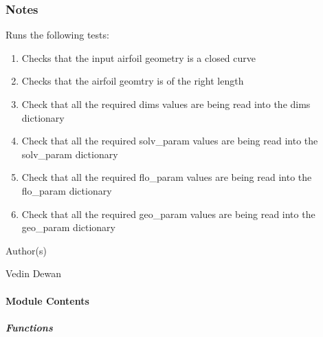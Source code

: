 \documentclass[letterpaper,10pt,english]{sphinxmanual}
\begin{document}
\subsubsection*{Notes}

\sphinxAtStartPar
Runs the following tests:
\begin{enumerate}
%
\item {} 
\sphinxAtStartPar
Checks that the input airfoil geometry is a closed curve

\item {} 
\sphinxAtStartPar
Checks that the airfoil geomtry is of the right length

\item {} 
\sphinxAtStartPar
Check that all the required dims values are being read into the dims dictionary

\item {} 
\sphinxAtStartPar
Check that all the required solv\_param values are being read into the solv\_param dictionary

\item {} 
\sphinxAtStartPar
Check that all the required flo\_param values are being read into the flo\_param dictionary

\item {} 
\sphinxAtStartPar
Check that all the required geo\_param values are being read into the geo\_param dictionary

\end{enumerate}

\sphinxAtStartPar
Author(s)

\sphinxAtStartPar
Vedin Dewan


\paragraph{Module Contents}
\label{\detokenize{autoapi/tests/test_Input/index:module-contents}}

\subparagraph{Functions}
\label{\detokenize{autoapi/tests/test_Input/index:functions}}
\end{document}
